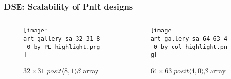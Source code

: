 \begin{frame}
    \frametitle{DSE: Scalability of PnR designs}

    \begin{columns}
        \begin{column}{0.5\textwidth}
            \begin{figure}
                \centering
                \texttt{[image: art\_gallery\_sa\_32\_31\_8\_0\_by\_PE\_highlight.png]}
                \caption{\(32 \times 31\) \(posit \langle 8,1 \rangle \beta\) array}
            \end{figure}
        \end{column}

        \begin{column}{0.5\textwidth}
            \begin{figure}
                \centering
                \texttt{[image: art\_gallery\_sa\_64\_63\_4\_0\_by\_col\_highlight.png]}
                \caption{\(64 \times 63\) \(posit \langle 4,0 \rangle \beta\) array}
            \end{figure}
        \end{column}
    \end{columns}

\end{frame}

